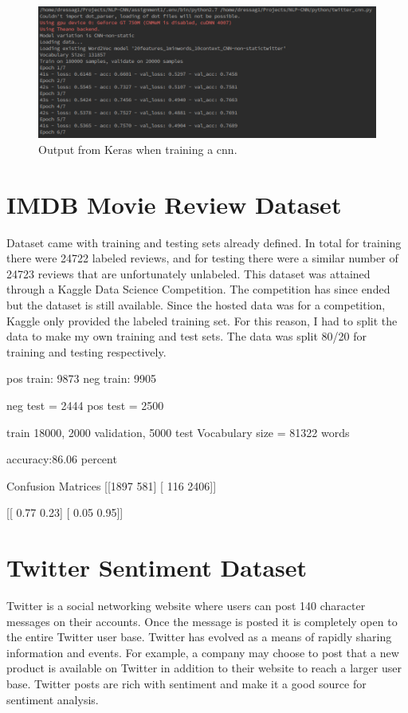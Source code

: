 \documentclass[12pt]{article}
\begin{document}
\begin{figure}[htbp!]
	\centering
	\includegraphics[scale=.4]{training.png}
	\caption{Output from Keras when training a \ac{cnn}.}
	\label{fig:training}
\end{figure}



\section{IMDB Movie Review Dataset}
Dataset came with training and testing sets already defined. In total for training there were 24722 labeled reviews, and for testing there were a similar number of 24723 reviews that are unfortunately unlabeled. This dataset was attained through a Kaggle Data Science Competition. The competition has since ended but the dataset is still available. Since the hosted data was for a competition, Kaggle only provided the labeled training set. For this reason, I had to split the data to make my own training and test sets. The data was split 80\slash20 for training and testing respectively.

pos train: 9873
neg train: 9905

neg test = 2444
pos test = 2500

train 18000, 2000 validation, 5000 test
Vocabulary size = 81322 words

accuracy:86.06 percent

Confusion Matrices
[[1897  581]
[ 116 2406]]

[[ 0.77  0.23]
[ 0.05  0.95]]


\section{Twitter Sentiment Dataset}

Twitter is a social networking website \cite{twitter} where users can post 140 character messages on their accounts. Once the message is posted it is completely open to the entire Twitter user base. Twitter has evolved as a means of rapidly sharing information and events. For example, a company may choose to post that a new product is available on Twitter in addition to their website to reach a larger user base. Twitter posts are rich with sentiment and make it a good source for sentiment analysis.
\end{document}
